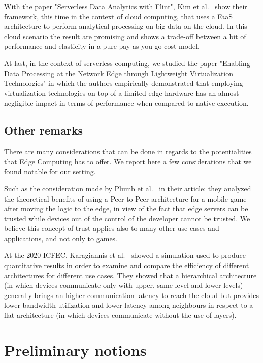 With the paper "Serverless Data Analytics with Flint", Kim et al.~\cite{serverless-analytics-cloud} show their framework, this time in the context  of cloud computing, that uses a FaaS architecture to perform analytical processing on big data on the cloud. In this cloud scenario the result are promising and shows a trade-off between a bit of performance and elasticity in a pure pay-as-you-go cost model.

At last, in the context of serverless computing, we studied the paper "Enabling Data Processing at the Network Edge through Lightweight Virtualization Technologies" \cite{lightweight-virtualization} in which the authors empirically demonstrated that employing virtualization technologies on top of a limited edge hardware has an almost negligible impact in terms of performance when compared to native execution.


\subsection{Other remarks}
There are many considerations that can be done in regards to the potentialities that Edge Computing has to offer.
We report here a few considerations that we found notable for our setting.

Such as the consideration made by Plumb et al.~\cite{google-edge-for-mmog} in their article: they analyzed the theoretical benefits of using a Peer-to-Peer architecture for a mobile game after moving the logic to the edge, in view of the fact that edge servers can be trusted while devices out of the control of the developer cannot be trusted.
We believe this concept of trust applies also to many other use cases and applications, and not only to games.

At the 2020 ICFEC, Karagiannis et al.~\cite{architecture-comparison} showed a simulation used to produce quantitative results in order to examine and compare the efficiency of different architectures for different use cases. They showed that a hierarchical architecture (in which devices communicate only with upper, same-level and lower levels) generally brings an higher communication latency to reach the cloud but provides lower bandwidth utilization and lower latency among neighbours in respect to a flat architecture (in which devices communicate without the use of layers).



\iffalse
\section{Preliminary notions}
\label{sec:preliminaries}


